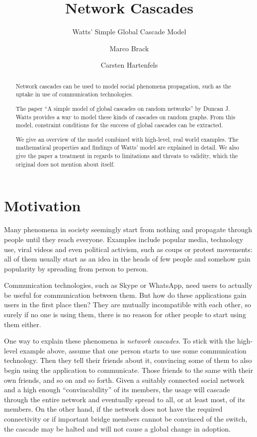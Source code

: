 \documentclass{sig-alternate-05-2015}
\begin{document}
\title{Network Cascades}
\subtitle{Watts' Simple Global Cascade Model}
\author{Marco Brack \and Carsten Hartenfels}
\maketitle


\begin{abstract}
Network cascades can be used to model social phenomena propagation, such as the uptake in use of communication technologies.

The paper ``A simple model of global cascades on random networks'' by Duncan J. Watts provides a way to model these kinds of cascades on random graphs. From this model, constraint conditions for the success of global cascades can be extracted.

We give an overview of the model combined with high-level, real world examples. The mathematical properties and findings of Watts' model are explained in detail. We also give the paper a treatment in regards to limitations and threats to validity, which the original does not mention about itself.
\end{abstract}


\section{Motivation}\label{sec:motivation}

Many phenomena in society seemingly start from nothing and propagate through people until they reach everyone. Examples include popular media, technology use, viral videos and even political activism, such as coups or protest movements: all of them usually start as an idea in the heads of few people and somehow gain popularity by spreading from person to person.

Communication technologies, such as Skype or WhatsApp, need users to actually be useful for communication between them. But how do these applications gain users in the first place then? They are mutually incompatible with each other, so surely if no one is using them, there is no reason for other people to start using them either.

One way to explain these phenomena is \emph{network cascades}. To stick with the high-level example above, assume that one person starts to use some communication technology. Then they tell their friends about it, convincing some of them to also begin using the application to communicate. Those friends to the same with their own friends, and so on and so forth. Given a suitably connected social network and a high enough ``convincability'' of its members, the usage will cascade through the entire network and eventually spread to all, or at least most, of its members. On the other hand, if the network does not have the required connectivity or if important bridge members cannot be convinced of the switch, the cascade may be halted and will not cause a global change in adoption.
\end{document}
